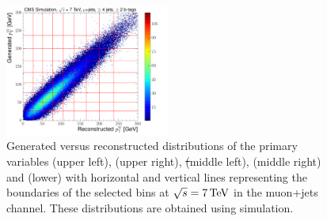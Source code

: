 \begin{figure}[hbtp]
	 \includegraphics[width=0.48\textwidth]{Chapters/04_Analysis/04b_XSections/images/binning/muon_WPT_7TeV.pdf}\hfill
	 \caption[Generated versus reconstructed distributions of the primary variables at $\sqrt{s}=7\TeV$ in the
	 muon+jets channel.]{Generated versus reconstructed distributions of the primary variables \met (upper left),
	 \HT (upper right), \st (middle left), \mt (middle right) and \wpt (lower) with horizontal and vertical lines
	 representing the boundaries of the selected bins at $\sqrt{s}=7\TeV$ in the muon+jets channel. These
	 distributions are obtained using \ttbar simulation.}
     \label{fig:binning_7TeV_muon}
 \end{figure}

